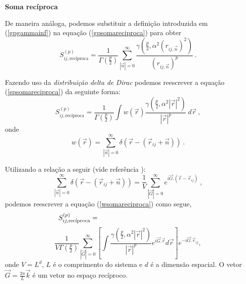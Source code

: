 \documentclass[twocolumn,a4,11pt]{article}
\begin{document}
\noindent
{\bf Soma recíproca}

De maneira análoga, podemos substituir a definição introduzida em (\ref{gpgammainf}) na equação (\ref{gpsomareciproca}) para obter
\begin{equation}
S^{(p)}_{ij,\text{recíproca}} =\frac{1}{\Gamma\left(\frac{p}{2}\right) }  \sum_{|\vec{n}|=0}^{\infty} \frac{
\gamma\left(\frac{p}{2}, \alpha^{2} (r_{ij,\vec{n}})^{2}\right)}{ 
(r_{ij,\vec{n}})^{p} }~ .
\label{spsomareciproca}
\end{equation}

Fazendo uso da {\it distribuição delta de Dirac} podemos reescrever a equação (\ref{spsomareciproca}) da seguinte forma:
\begin{equation}
S^{(p)}_{ij,\text{recíproca}} =\frac{1}{\Gamma\left(\frac{p}{2}\right) }
\int w(\vec{r})
\frac{\gamma\left(\frac{p}{2}, \alpha^{2} \left| \vec{r} \right|^{2}\right)}{
\left| \vec{r} \right|^{p} } ~ d\vec{r} ~ ,
\label{wsomareciproca}
\end{equation}
onde
\begin{equation}
w(\vec{r})=\sum_{|\vec{n}|=0}^{\infty} \delta(\vec{r}-(\vec{r}_{ij}+\vec{n}))~ .
\nonumber
\end{equation}

Utilizando a relação a seguir (vide referência \cite{NIJ}):
\begin{equation}
\sum_{|\vec{n}|=0}^{\infty} \delta(\vec{r}-(\vec{r}_{ij}+\vec{n}))=
\frac{1}{V} \sum_{|\vec{G}|=0}^{\infty} e^{i \vec{G}.(\vec{r}-\vec{r}_{ij})} ~ ,
\nonumber
\end{equation}
podemos reescrever a equação (\ref{wsomareciproca}) como segue,
\begin{equation}
S^{(p)}_{ij,\text{recíproca}} =
~~~~~~~~~~~~~~~~~~~~~~~~~~~~~~~~~~~~~~~~~~~~
\nonumber \\
\end{equation}
\begin{equation}
\frac{1}{V \Gamma\left(\frac{p}{2}\right) }
\sum_{|\vec{G}|=0}^{\infty}
\left[
\int
\frac{\gamma\left(\frac{p}{2}, \alpha^{2} \left| \vec{r} \right|^{2}\right)}{
\left| \vec{r} \right|^{p} }  e^{i \vec{G}.\vec{r}} d\vec{r} 
\right]
e^{-i \vec{G}.\vec{r}_{ij}} ,
\label{intsomareciproca}
\end{equation}
onde $V=L^{d}$, $L$ é o comprimento do sistema e $d$ é a dimensão espacial. O vetor $\vec{G}=\frac{2 \pi}{L} \vec{k}$ é um vetor no espaço recíproco.
\end{document}
